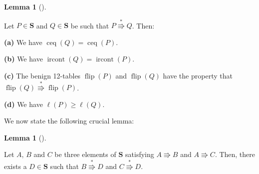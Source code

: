 \documentclass[numbers=enddot,12pt,final,onecolumn,notitlepage]{scrartcl}%
\theoremstyle{definition}
\newtheorem{lem}[theo]{Lemma}
\newenvironment{lemma}[1][]
{\begin{lem}[#1]\begin{leftbar}}
{\end{leftbar}\end{lem}}
\newenvironment{proof}[1][Proof]{\noindent\textbf{#1.} }{\ \rule{0.5em}{0.5em}}
\begin{document}
\begin{lemma}
\label{lem.descent-resolution-*props}Let $P\in\mathbf{S}$ and $Q\in\mathbf{S}$
be such that $P\overset{\ast}{\Rrightarrow}Q$. Then:

\textbf{(a)} We have $\operatorname*{ceq}\left(  Q\right)
=\operatorname*{ceq}\left(  P\right)  $.

\textbf{(b)} We have $\operatorname*{ircont}\left(  Q\right)
=\operatorname*{ircont}\left(  P\right)  $.

\textbf{(c)} The benign 12-tables $\operatorname*{flip}\left(  P\right)  $ and
$\operatorname*{flip}\left(  Q\right)  $ have the property that
$\operatorname*{flip}\left(  Q\right)  \overset{\ast}{\Rrightarrow
}\operatorname*{flip}\left(  P\right)  $.

\textbf{(d)} We have $\ell\left(  P\right)  \geq\ell\left(  Q\right)  $.
\end{lemma}


We now state the following crucial lemma:

\begin{lemma}
\label{prop.descent-resolution-hyps}Let $A$, $B$ and $C$ be three elements of
$\mathbf{S}$ satisfying $A\Rrightarrow B$ and $A\Rrightarrow C$. Then, there
exists a $D\in\mathbf{S}$ such that $B\overset{\ast}{\Rrightarrow}D$ and
$C\overset{\ast}{\Rrightarrow}D$.
\end{lemma}
\end{document}

